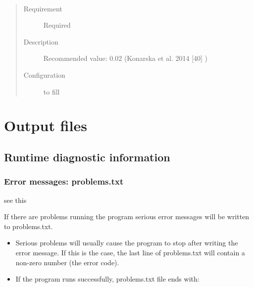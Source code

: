 \documentclass[letterpaper,10pt,english]{sphinxmanual}
\begin{document}
\begin{fulllineitems}
\label{\detokenize{input_files/SOLWEIG_input/SOLWEIGinput:cmdoption-arg-transmin}}~\begin{quote}\begin{description}
\item[{Requirement}] \leavevmode
Required

\item[{Description}] \leavevmode
Recommended value: 0.02 (Konarska et al. 2014 {[}40{]} )

\item[{Configuration}] \leavevmode
to fill

\end{description}\end{quote}

\end{fulllineitems}



\chapter{Output files}
\label{\detokenize{output_files/output_files:output-files}}\label{\detokenize{output_files/output_files::doc}}\label{\detokenize{output_files/output_files:id1}}

\section{Runtime diagnostic information}
\label{\detokenize{output_files/output_files:runtime-diagnostic-information}}

\subsection{Error messages: problems.txt}
\label{\detokenize{output_files/output_files:error-messages-problems-txt}}\label{\detokenize{output_files/output_files:problems-txt}}
see this {\hyperref[\detokenize{output_files/output_files:output-files}]{}}

If there are problems running the program serious error messages will be
written to problems.txt.
\begin{itemize}
\item {} 
Serious problems will usually cause the program to stop after writing
the error message. If this is the case, the last line of problems.txt
will contain a non-zero number (the error code).

\item {} 
If the program runs successfully, problems.txt file ends with:

%
\begin{sphinxVerbatim}[commandchars=\\\{\}]
 
\end{sphinxVerbatim}

\end{itemize}
\end{document}
